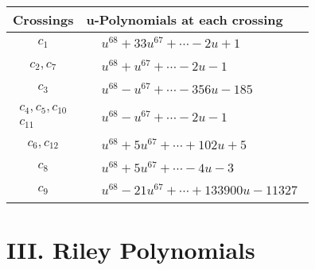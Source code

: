 \documentclass[1p]{elsarticle_modified}
\theoremstyle{definition}
\begin{document}
\begin{tabular}{m{50pt}|m{274pt}}
Crossings & \hspace{64pt}u-Polynomials at each crossing \\
\hline $$\begin{aligned}c_{1}\end{aligned}$$&$\begin{aligned}
&u^{68}+33 u^{67}+\cdots-2 u+1
\end{aligned}$\\
\hline $$\begin{aligned}c_{2},c_{7}\end{aligned}$$&$\begin{aligned}
&u^{68}+u^{67}+\cdots-2 u-1
\end{aligned}$\\
\hline $$\begin{aligned}c_{3}\end{aligned}$$&$\begin{aligned}
&u^{68}- u^{67}+\cdots-356 u-185
\end{aligned}$\\
\hline $$\begin{aligned}c_{4},c_{5},c_{10}\\c_{11}\end{aligned}$$&$\begin{aligned}
&u^{68}- u^{67}+\cdots-2 u-1
\end{aligned}$\\
\hline $$\begin{aligned}c_{6},c_{12}\end{aligned}$$&$\begin{aligned}
&u^{68}+5 u^{67}+\cdots+102 u+5
\end{aligned}$\\
\hline $$\begin{aligned}c_{8}\end{aligned}$$&$\begin{aligned}
&u^{68}+5 u^{67}+\cdots-4 u-3
\end{aligned}$\\
\hline $$\begin{aligned}c_{9}\end{aligned}$$&$\begin{aligned}
&u^{68}-21 u^{67}+\cdots+133900 u-11327
\end{aligned}$\\
\hline
\end{tabular}\newpage\renewcommand{\arraystretch}{1}
\centering \section*{ III. Riley Polynomials}
\end{document}

